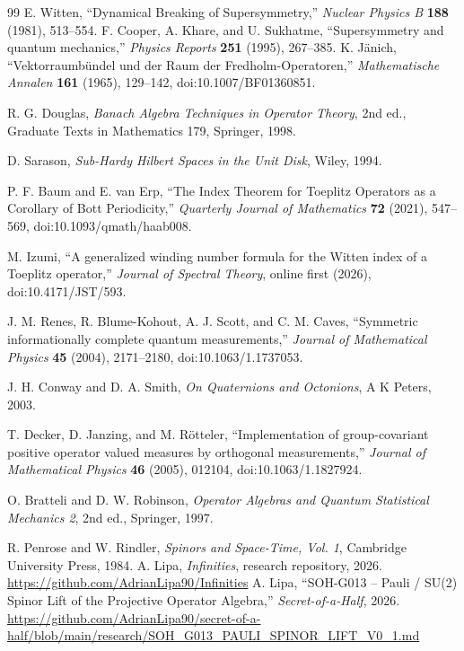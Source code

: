 \documentclass[11pt,a4paper]{article}
\begin{document}
\begin{thebibliography}{99}
 E. Witten, ``Dynamical Breaking of Supersymmetry,'' \emph{Nuclear Physics B} \textbf{188} (1981), 513--554.
 F. Cooper, A. Khare, and U. Sukhatme, ``Supersymmetry and quantum mechanics,'' \emph{Physics Reports} \textbf{251} (1995), 267--385.
 K. J\"anich, ``Vektorraumb\"undel und der Raum der Fredholm-Operatoren,'' \emph{Mathematische Annalen} \textbf{161} (1965), 129--142, doi:10.1007/BF01360851.

 R. G. Douglas, \emph{Banach Algebra Techniques in Operator Theory}, 2nd ed., Graduate Texts in Mathematics 179, Springer, 1998.

 D. Sarason, \emph{Sub-Hardy Hilbert Spaces in the Unit Disk}, Wiley, 1994.

 P. F. Baum and E. van Erp, ``The Index Theorem for Toeplitz Operators as a Corollary of Bott Periodicity,'' \emph{Quarterly Journal of Mathematics} \textbf{72} (2021), 547--569, doi:10.1093/qmath/haab008.

 M. Izumi, ``A generalized winding number formula for the Witten index of a Toeplitz operator,'' \emph{Journal of Spectral Theory}, online first (2026), doi:10.4171/JST/593.

 J. M. Renes, R. Blume-Kohout, A. J. Scott, and C. M. Caves, ``Symmetric informationally complete quantum measurements,'' \emph{Journal of Mathematical Physics} \textbf{45} (2004), 2171--2180, doi:10.1063/1.1737053.

 J. H. Conway and D. A. Smith, \emph{On Quaternions and Octonions}, A K Peters, 2003.

 T. Decker, D. Janzing, and M. R\"otteler, ``Implementation of group-covariant positive operator valued measures by orthogonal measurements,'' \emph{Journal of Mathematical Physics} \textbf{46} (2005), 012104, doi:10.1063/1.1827924.

 O. Bratteli and D. W. Robinson, \emph{Operator Algebras and Quantum Statistical Mechanics 2}, 2nd ed., Springer, 1997.

 R. Penrose and W. Rindler, \emph{Spinors and Space-Time, Vol. 1}, Cambridge University Press, 1984.
 A. Lipa, \emph{Infinities}, research repository, 2026. \url{https://github.com/AdrianLipa90/Infinities}
 A. Lipa, ``SOH-G013 -- Pauli / SU(2) Spinor Lift of the Projective Operator Algebra,'' \emph{Secret-of-a-Half}, 2026. \url{https://github.com/AdrianLipa90/secret-of-a-half/blob/main/research/SOH_G013_PAULI_SPINOR_LIFT_V0_1.md}
\end{thebibliography}
\end{document}
